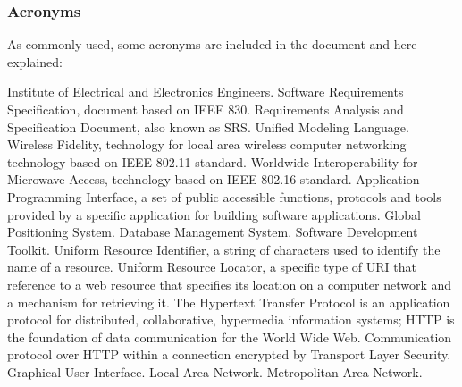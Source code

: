 \subsubsection{Acronyms}
As commonly used, some acronyms are included in the document and here explained:
\begin{itemize}
	 Institute of Electrical and Electronics Engineers.
	 Software Requirements Specification, document based on IEEE 830.
	 Requirements Analysis and Specification Document, also known as SRS.
	 Unified Modeling Language.
	 Wireless Fidelity, technology for local area wireless computer networking technology based on IEEE 802.11 standard.
	 Worldwide Interoperability for Microwave Access, technology based on IEEE 802.16 standard.
	 Application Programming Interface, a set of public accessible functions, protocols and tools provided by a specific application for building software applications.
	 Global Positioning System.
	 Database Management System.
	 Software Development Toolkit.
	 Uniform Resource Identifier, a string of characters used to identify the name of a resource.
	 Uniform Resource Locator, a specific type of URI that reference to a web resource that specifies its location on a computer network and a mechanism for retrieving it.
	 The Hypertext Transfer Protocol is an application protocol for distributed, collaborative, hypermedia information systems; HTTP is the foundation of data communication for the World Wide Web.
	 Communication protocol over HTTP within a connection encrypted by Transport Layer Security.
	 Graphical User Interface.
	 Local Area Network.
	 Metropolitan Area Network.
\end{itemize}

